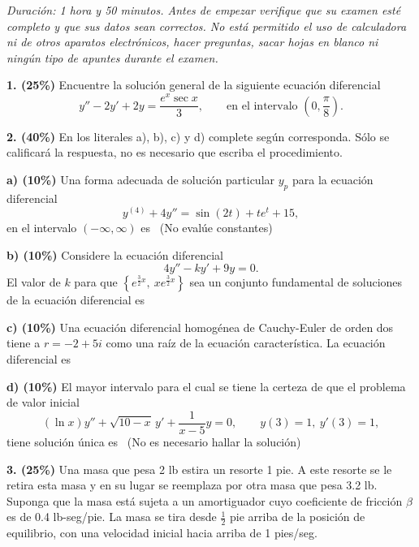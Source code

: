 \documentclass[11pt]{article}
\newcommand{\rp}{\underline{\hspace{3.2cm}}}
\begin{document}
\examheader

\vspace{4pt}
\noindent\textit{Duración: 1 hora y 50 minutos. Antes de empezar verifique que su examen esté completo y que sus datos sean correctos. No está permitido el uso de calculadora ni de otros aparatos electrónicos, hacer preguntas, sacar hojas en blanco ni ningún tipo de apuntes durante el examen.}

\vspace{6pt}
\noindent\textbf{1. (25\%)} Encuentre la solución general de la siguiente ecuación diferencial
\[
y''-2y'+2y=\frac{e^{x}\sec x}{3}, \qquad \text{en el intervalo } \left(0,\frac{\pi}{8}\right).
\]

\vspace{7cm}

\newpage

\noindent\textbf{2. (40\%)} En los literales a), b), c) y d) complete según corresponda. Sólo se calificará la respuesta, no es necesario que escriba el procedimiento.

\vspace{0.3cm}
\noindent\textbf{a) (10\%)} Una forma adecuada de solución particular $y_p$ para la ecuación diferencial
\[
y^{(4)}+4y''=\sin(2t)+te^t+15,
\]
en el intervalo $(-\infty,\infty)$ es \rp\ (No evalúe constantes)

\vspace{0.3cm}
\noindent\textbf{b) (10\%)} Considere la ecuación diferencial
\[
4y''-ky'+9y=0.
\]
El valor de $k$ para que $\left\{e^{\frac{3}{2}x},\ xe^{\frac{3}{2}x}\right\}$ sea un conjunto fundamental de soluciones de la ecuación diferencial es \rp

\vspace{0.3cm}
\noindent\textbf{c) (10\%)} Una ecuación diferencial homogénea de Cauchy-Euler de orden dos tiene a $r=-2+5i$ como una raíz de la ecuación característica. La ecuación diferencial es

\rp

\vspace{0.3cm}
\noindent\textbf{d) (10\%)} El mayor intervalo para el cual se tiene la certeza de que el problema de valor inicial
\[
(\ln x)y''+\sqrt{10-x}\,y'+\frac{1}{x-5}y=0, \qquad y(3)=1,\ y'(3)=1,
\]
tiene solución única es \rp\ (No es necesario hallar la solución)

\newpage

\noindent\textbf{3. (25\%)} Una masa que pesa 2 lb estira un resorte 1 pie. A este resorte se le retira esta masa y en su lugar se reemplaza por otra masa que pesa 3.2 lb. Suponga que la masa está sujeta a un amortiguador cuyo coeficiente de fricción $\beta$ es de 0.4 lb-seg/pie. La masa se tira desde $\frac{1}{2}$ pie arriba de la posición de equilibrio, con una velocidad inicial hacia arriba de 1 pies/seg.
\end{document}
